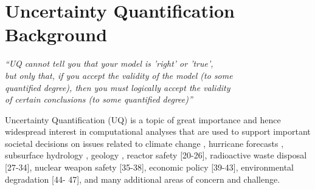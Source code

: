 

\chapter{Uncertainty Quantification Background}\label{cap:background}


\begin{flushright}
	\textit{``UQ cannot tell you that your model is 'right' or 'true', \\
	but only that, if you accept the validity of the model (to some \\
	quantified degree), then you must logically accept the validity\\
	of certain conclusions (to some quantified degree)''\\
	\cite{Sullivan2015}}
\end{flushright}

Uncertainty Quantification (UQ) is a topic of great importance and hence widespread interest in computational analyses that are used to support important societal decisions on issues related to climate change \cite{allen2000quantifying, patt2005taking}, hurricane forecasts \cite{Tobergte2013}, subsurface hydrology \cite{Baroni2014a}, geology \cite{Guerra2016}, reactor safety [20-26], radioactive waste disposal [27-34], nuclear weapon safety [35-38], economic policy [39-43], environmental degradation [44- 47], and many additional areas of concern and challenge.

